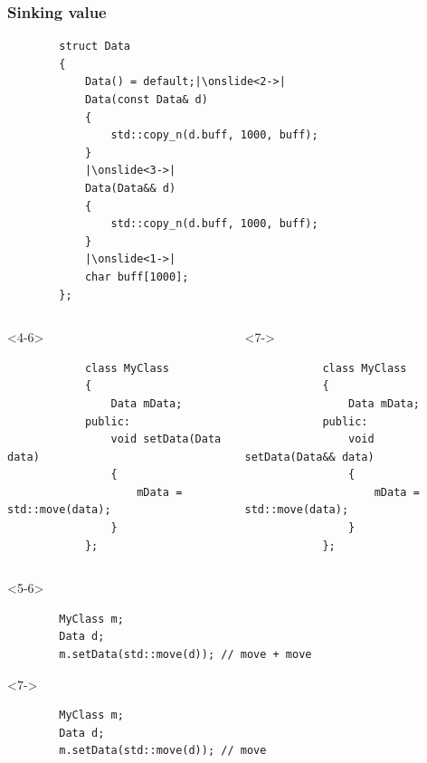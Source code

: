 \documentclass{beamer}
\begin{document}
\begin{frame}[fragile,t]
\frametitle{Sinking value}
	\begin{lstlisting}
        struct Data
        {
            Data() = default;|\onslide<2->|
            Data(const Data& d)
            {
                std::copy_n(d.buff, 1000, buff);
            }
            |\onslide<3->|
            Data(Data&& d)
            {
                std::copy_n(d.buff, 1000, buff);
            }
            |\onslide<1->|
            char buff[1000];
        };
	\end{lstlisting}


	\begin{columns}[T]
        \begin{onlyenv}<4-6>
        \begin{lstlisting}
            class MyClass
            {
                Data mData;
            public:		
                void setData(Data data)
                {
                    mData = std::move(data);
                }
            };
        \end{lstlisting}
        \end{onlyenv}
        \begin{onlyenv}<7->
        \begin{lstlisting}
            class MyClass
            {
                Data mData;
            public:		
                void setData(Data&& data)
                {
                    mData = std::move(data);
                }
            };
        \end{lstlisting}
        \end{onlyenv}
    \end{columns}
    \hrulefill
    \begin{onlyenv}<5-6>
    \begin{lstlisting}
        MyClass m;
        Data d;
        m.setData(std::move(d)); // move + move
    \end{lstlisting}
    \end{onlyenv}
    \begin{onlyenv}<7->
    \begin{lstlisting}
        MyClass m;
        Data d;
        m.setData(std::move(d)); // move
    \end{lstlisting}
    \end{onlyenv}
\end{frame}
\end{document}
